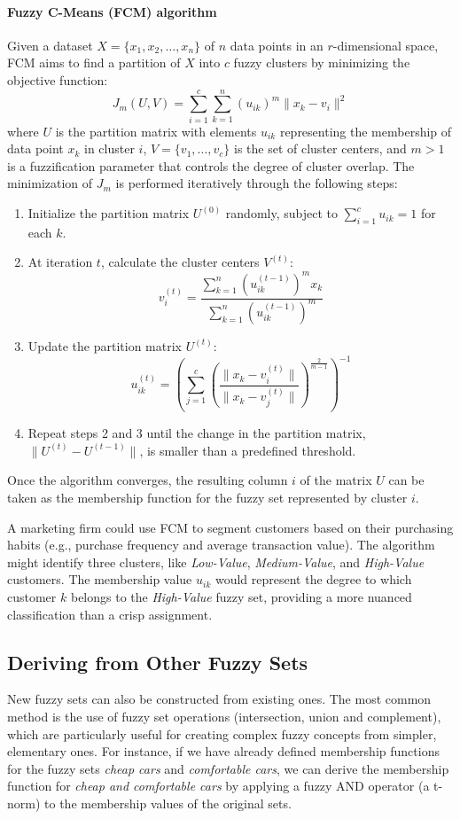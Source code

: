 \paragraph{Fuzzy C-Means (FCM) algorithm} Given a dataset $X = \{x_1, x_2, \ldots, x_n\}$ of $n$ data points in an $r$-dimensional space, FCM aims to find a partition of $X$ into $c$ fuzzy clusters by minimizing the objective function:
\[
J_m(U, V) = \sum_{i=1}^{c} \sum_{k=1}^{n} (u_{ik})^m \|x_k - v_i\|^2
\]
where $U$ is the partition matrix with elements $u_{ik}$ representing the membership of data point $x_k$ in cluster $i$, $V = \{v_1, \ldots, v_c\}$ is the set of cluster centers, and $m > 1$ is a fuzzification parameter that controls the degree of cluster overlap. The minimization of $J_m$ is performed iteratively through the following steps:
\begin{enumerate}
    \item Initialize the partition matrix $U^{(0)}$ randomly, subject to $\sum_{i=1}^{c} u_{ik} = 1$ for each $k$.
    \item At iteration $t$, calculate the cluster centers $V^{(t)}$:
    \[
    v_i^{(t)} = \frac{\sum_{k=1}^{n} (u_{ik}^{(t-1)})^m x_k}{\sum_{k=1}^{n} (u_{ik}^{(t-1)})^m}
    \]
    \item Update the partition matrix $U^{(t)}$:
    \[
    u_{ik}^{(t)} = \left( \sum_{j=1}^{c} \left( \frac{\|x_k - v_i^{(t)}\|}{\|x_k - v_j^{(t)}\|} \right)^{\frac{2}{m-1}} \right)^{-1}
    \]
    \item Repeat steps 2 and 3 until the change in the partition matrix, $\|U^{(t)} - U^{(t-1)}\|$, is smaller than a predefined threshold.
\end{enumerate}
Once the algorithm converges, the resulting column $i$ of the matrix $U$ can be taken as the membership function for the fuzzy set represented by cluster $i$.

\begin{example}
    A marketing firm could use FCM to segment customers based on their purchasing habits (e.g., purchase frequency and average transaction value). The algorithm might identify three clusters, like \emph{Low-Value}, \emph{Medium-Value}, and \emph{High-Value} customers. The membership value $u_{ik}$ would represent the degree to which customer $k$ belongs to the \emph{High-Value} fuzzy set, providing a more nuanced classification than a crisp assignment.
\end{example}

\subsection{Deriving from Other Fuzzy Sets}
New fuzzy sets can also be constructed from existing ones. The most common method is the use of fuzzy set operations (intersection, union and complement), which are particularly useful for creating complex fuzzy concepts from simpler, elementary ones. For instance, if we have already defined membership functions for the fuzzy sets \emph{cheap cars} and \emph{comfortable cars}, we can derive the membership function for \emph{cheap and comfortable cars} by applying a fuzzy AND operator (a t-norm) to the membership values of the original sets.\\

